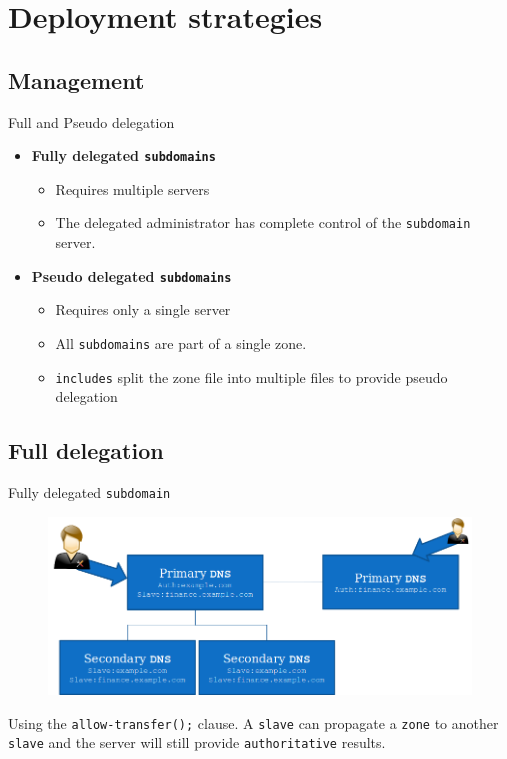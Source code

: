 \documentclass[xcolor=table,aspectratio=169]{beamer}
\begin{document}
\section{Deployment strategies}
\subsection{Management}
\begin{frame}{Full and Pseudo delegation}
  \begin{itemize}
    \item \textbf{Fully delegated \texttt{subdomains}}
      \begin{itemize}
        \item Requires multiple servers
        \item The delegated administrator has complete control of the \texttt{subdomain} server.
      \end{itemize}
    \item \textbf{Pseudo delegated \texttt{subdomains}}
      \begin{itemize}
        \item Requires only a single server
        \item All \texttt{subdomains} are part of a single zone.
        \item \texttt{includes} split the zone file into multiple files to provide pseudo delegation 
      \end{itemize}
  \end{itemize}
\end{frame}

\subsection{Full delegation}
\begin{frame}{Fully delegated \texttt{subdomain}}
  \begin{figure}
    \begin{center}
      \includegraphics[width=.7\linewidth]{FullyDelegated.png}
    \end{center}
  \end{figure}
  \begin{tcolorbox}
    \begin{center}
      \scriptsize Using the \texttt{allow-transfer();} clause. A \texttt{slave} can propagate a \texttt{zone} to another \texttt{slave} and the server will still provide \texttt{authoritative} results.
    \end{center}
  \end{tcolorbox}
\end{frame}
\end{document}
